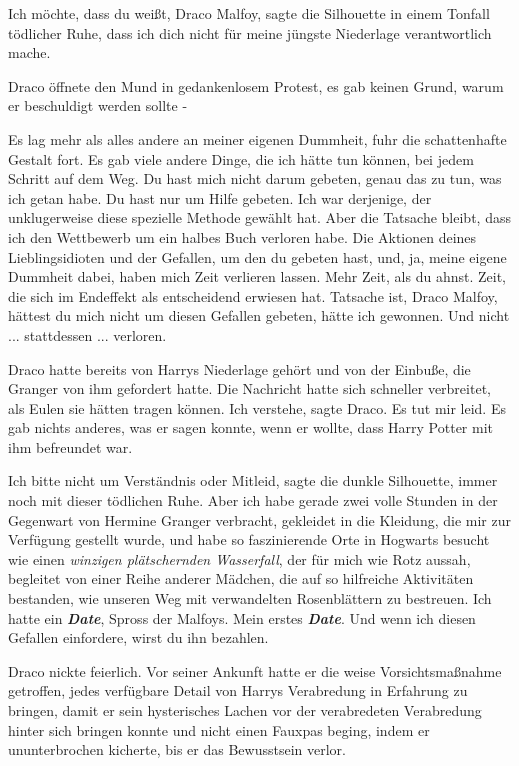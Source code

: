 \glqq{}Ich möchte, dass du weißt, Draco Malfoy\grqq{}, sagte die Silhouette in
einem Tonfall tödlicher Ruhe, \glqq{}dass ich dich nicht für meine jüngste
Niederlage verantwortlich mache.\grqq{}

Draco öffnete den Mund in gedankenlosem Protest, es gab keinen Grund, warum er
beschuldigt werden sollte -

\glqq{}Es lag mehr als alles andere an meiner eigenen Dummheit\grqq{}, fuhr die
schattenhafte Gestalt fort. \glqq{}Es gab viele andere Dinge, die ich hätte tun
können, bei jedem Schritt auf dem Weg. Du hast mich nicht darum gebeten, genau
das zu tun, was ich getan habe. Du hast nur um Hilfe gebeten. Ich war derjenige,
der unklugerweise diese spezielle Methode gewählt hat. Aber die Tatsache bleibt,
dass ich den Wettbewerb um ein halbes Buch verloren habe. Die Aktionen deines
Lieblingsidioten und der Gefallen, um den du gebeten hast, und, ja, meine eigene
Dummheit dabei, haben mich Zeit verlieren lassen. Mehr Zeit, als du ahnst. Zeit,
die sich im Endeffekt als entscheidend erwiesen hat. Tatsache ist, Draco Malfoy,
hättest du mich nicht um diesen Gefallen gebeten, hätte ich gewonnen. Und
nicht ... stattdessen ... verloren.\grqq{}

Draco hatte bereits von Harrys Niederlage gehört und von der Einbuße, die
Granger von ihm gefordert hatte. Die Nachricht hatte sich schneller verbreitet,
als Eulen sie hätten tragen können. \glqq{}Ich verstehe\grqq{}, sagte Draco.
\glqq{}Es tut mir leid.\grqq{} Es gab nichts anderes, was er sagen konnte, wenn
er wollte, dass Harry Potter mit ihm befreundet war.

\glqq{}Ich bitte nicht um Verständnis oder Mitleid\grqq{}, sagte die dunkle
Silhouette, immer noch mit dieser tödlichen Ruhe. \glqq{}Aber ich habe gerade
zwei volle Stunden in der Gegenwart von Hermine Granger verbracht, gekleidet in
die Kleidung, die mir zur Verfügung gestellt wurde, und habe so faszinierende
Orte in Hogwarts besucht wie einen \emph{winzigen plätschernden Wasserfall}, der
für mich wie Rotz aussah, begleitet von einer Reihe anderer Mädchen, die auf so
hilfreiche Aktivitäten bestanden, wie unseren Weg mit verwandelten Rosenblättern
zu bestreuen. Ich hatte ein \textbf{\emph{Date}}, Spross der Malfoys. Mein
erstes \textbf{\emph{Date}}. Und wenn ich diesen Gefallen einfordere, wirst du
ihn bezahlen.\grqq{}

Draco nickte feierlich. Vor seiner Ankunft hatte er die weise Vorsichtsmaßnahme
getroffen, jedes verfügbare Detail von Harrys Verabredung in Erfahrung zu
bringen, damit er sein hysterisches Lachen vor der verabredeten Verabredung
hinter sich bringen konnte und nicht einen Fauxpas beging, indem er
ununterbrochen kicherte, bis er das Bewusstsein verlor.

